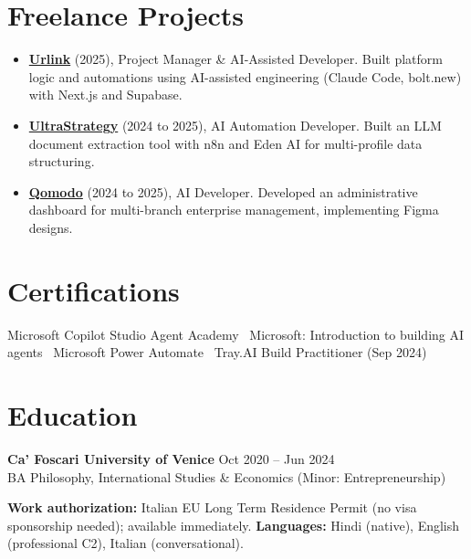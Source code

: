 \documentclass[a4paper,10pt]{article}
\begin{document}
\section{Freelance Projects}
\begin{itemize}
 \item \textbf{\href{https://smarturlink.com/}{Urlink}} (2025), Project Manager \& AI-Assisted Developer. Built platform logic and automations using AI-assisted engineering (Claude Code, bolt.new) with Next.js and Supabase.
 \item \textbf{\href{https://ultrastrategy.com}{UltraStrategy}} (2024 to 2025), AI Automation Developer. Built an LLM document extraction tool with n8n and Eden AI for multi-profile data structuring.
 \item \textbf{\href{https://www.qomodo.me/}{Qomodo}} (2024 to 2025), AI Developer. Developed an administrative dashboard for multi-branch enterprise management, implementing Figma designs.
\end{itemize}

\section{Certifications}
Microsoft Copilot Studio Agent Academy \textbullet\ Microsoft: Introduction to building AI agents \textbullet\ Microsoft Power Automate \textbullet\ Tray.AI Build Practitioner (Sep 2024)

\section{Education}
\textbf{Ca' Foscari University of Venice} \hfill Oct 2020 -- Jun 2024\\
BA Philosophy, International Studies \& Economics (Minor: Entrepreneurship)

\vspace{2pt}
{\small \textbf{Work authorization:} Italian EU Long Term Residence Permit (no visa sponsorship needed); available immediately. \quad \textbf{Languages:} Hindi (native), English (professional C2), Italian (conversational).}
\end{document}
